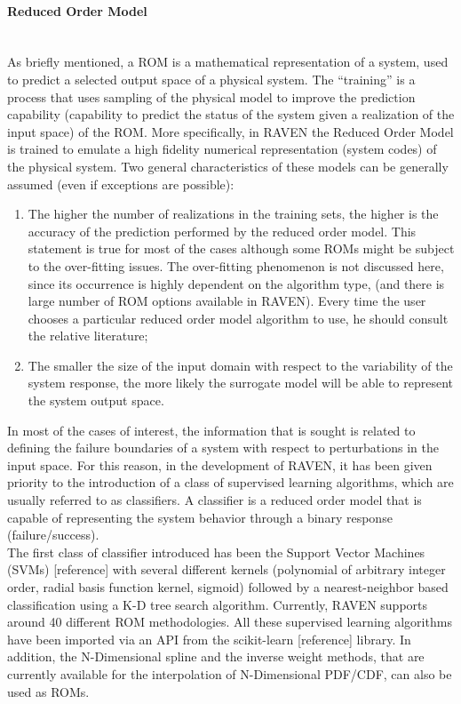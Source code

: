 \paragraph{Reduced Order Model} ~\\
 As briefly mentioned, a ROM is a mathematical representation of a system, used to predict a selected output space of a physical system. 
The ``training'' is a process that uses sampling of the physical model to improve the prediction capability (capability to predict the status of the system given a realization of the input space) of the ROM. More specifically, in RAVEN the Reduced Order Model is trained to emulate a high fidelity numerical representation (system codes) of the physical system. Two general characteristics of these models can be generally assumed (even if exceptions are possible):
\begin{enumerate}
   \item The higher the number of realizations in the training sets, the higher is the accuracy of the prediction performed by the reduced order model. This statement is true for most of the cases although some ROMs might be subject to the over-fitting issues. The over-fitting phenomenon is not discussed here, since its occurrence is highly dependent on the algorithm type, (and there is large number of ROM options available in RAVEN). Every time the user chooses a particular reduced order model algorithm to use, he should consult the relative literature;
   \item The smaller the size of the input domain with respect to the variability of the system response, the more likely the surrogate model will be able to represent the system output space.
\end{enumerate}
In most of the cases of interest, the information that is sought is related to defining the failure boundaries of a system with respect to perturbations in the input space. For this reason, in the development of RAVEN, it has been given priority to the introduction of a class of supervised learning algorithms, which are usually referred to as classifiers. A classifier is a reduced order model that is capable of representing the system behavior through a binary response (failure/success). 
\\The first class of classifier introduced has been the Support Vector Machines (SVMs) [reference] with several different kernels (polynomial of arbitrary integer order, radial basis function kernel, sigmoid) followed by a nearest-neighbor based classification using a K-D tree search algorithm. Currently, RAVEN supports around 40 different ROM methodologies. All these supervised learning algorithms have been imported via an API from the scikit-learn [reference] library. In addition, the N-Dimensional spline and the inverse weight methods, that are currently available for the interpolation of N-Dimensional PDF/CDF, can also be used as ROMs.

